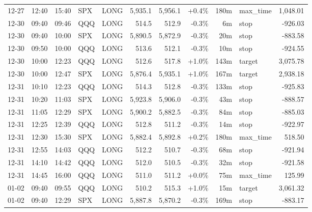 \documentclass[11pt,a4paper,twoside]{article}
\begin{document}
\begin{center}
\begin{longtable}{>{\color{txtmain}}l l l l l r r r r >{\color{txtmain}}l r}
12-27 & 12:40 & 15:40 & SPX & LONG & 5,935.1 & 5,956.1 & \textcolor{wingreen}{+0.4\%} & 180m & max\_time & \textcolor{wingreen}{1,048.01} \\
12-30 & 09:40 & 09:46 & QQQ & LONG & 514.5 & 512.9 & \textcolor{lossred}{-0.3\%} & 6m & stop & \textcolor{lossred}{-926.03} \\
12-30 & 09:40 & 10:00 & SPX & LONG & 5,890.5 & 5,872.9 & \textcolor{lossred}{-0.3\%} & 20m & stop & \textcolor{lossred}{-883.58} \\
12-30 & 09:50 & 10:00 & QQQ & LONG & 513.6 & 512.1 & \textcolor{lossred}{-0.3\%} & 10m & stop & \textcolor{lossred}{-924.55} \\
12-30 & 10:00 & 12:23 & QQQ & LONG & 512.6 & 517.8 & \textcolor{wingreen}{+1.0\%} & 143m & target & \textcolor{wingreen}{3,075.78} \\
12-30 & 10:00 & 12:47 & SPX & LONG & 5,876.4 & 5,935.1 & \textcolor{wingreen}{+1.0\%} & 167m & target & \textcolor{wingreen}{2,938.18} \\
12-31 & 10:10 & 12:23 & QQQ & LONG & 514.3 & 512.8 & \textcolor{lossred}{-0.3\%} & 133m & stop & \textcolor{lossred}{-925.83} \\
12-31 & 10:20 & 11:03 & SPX & LONG & 5,923.8 & 5,906.0 & \textcolor{lossred}{-0.3\%} & 43m & stop & \textcolor{lossred}{-888.57} \\
12-31 & 11:05 & 12:29 & SPX & LONG & 5,900.2 & 5,882.5 & \textcolor{lossred}{-0.3\%} & 84m & stop & \textcolor{lossred}{-885.03} \\
12-31 & 12:25 & 12:39 & QQQ & LONG & 512.8 & 511.2 & \textcolor{lossred}{-0.3\%} & 14m & stop & \textcolor{lossred}{-922.97} \\
12-31 & 12:30 & 15:30 & SPX & LONG & 5,882.4 & 5,892.8 & \textcolor{wingreen}{+0.2\%} & 180m & max\_time & \textcolor{wingreen}{518.50} \\
12-31 & 12:55 & 14:03 & QQQ & LONG & 512.2 & 510.7 & \textcolor{lossred}{-0.3\%} & 68m & stop & \textcolor{lossred}{-921.94} \\
12-31 & 14:10 & 14:42 & QQQ & LONG & 512.0 & 510.5 & \textcolor{lossred}{-0.3\%} & 32m & stop & \textcolor{lossred}{-921.58} \\
12-31 & 14:45 & 16:00 & QQQ & LONG & 511.0 & 511.2 & \textcolor{wingreen}{+0.0\%} & 75m & max\_time & \textcolor{wingreen}{125.99} \\
01-02 & 09:40 & 09:55 & QQQ & LONG & 510.2 & 515.3 & \textcolor{wingreen}{+1.0\%} & 15m & target & \textcolor{wingreen}{3,061.32} \\
01-02 & 09:40 & 12:29 & SPX & LONG & 5,887.8 & 5,870.2 & \textcolor{lossred}{-0.3\%} & 169m & stop & \textcolor{lossred}{-883.17} \\

\end{longtable}
\end{center}
\end{document}
